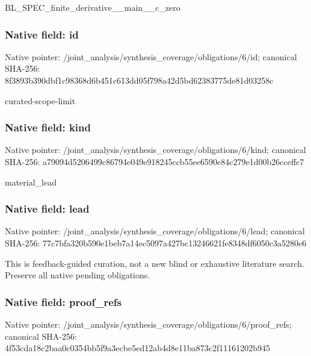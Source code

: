 \documentclass[10pt,a4paper]{article}
\begin{document}
\begingroup\raggedright\sloppy BL\_\allowbreak{}SPEC\_\allowbreak{}finite\_\allowbreak{}derivative\_\allowbreak{}\_\allowbreak{}main\_\allowbreak{}\_\allowbreak{}c\_\allowbreak{}zero\par\endgroup

\subsubsection{Native field: id}
Native pointer: /joint\_\allowbreak{}analysis/synthesis\_\allowbreak{}coverage/obligations/6/id; canonical SHA-256: 8f3893b390dbf1c98368d6b451c613dd05f798a42d5bd62383775de81d03258c

\begingroup\raggedright\sloppy curated-scope-limit\par\endgroup

\subsubsection{Native field: kind}
Native pointer: /joint\_\allowbreak{}analysis/synthesis\_\allowbreak{}coverage/obligations/6/kind; canonical SHA-256: a79094d5206499c86794e049e918245ccb55ee6590e84c279e1d00b26cceffc7

\begingroup\raggedright\sloppy material\_\allowbreak{}lead\par\endgroup

\subsubsection{Native field: lead}
Native pointer: /joint\_\allowbreak{}analysis/synthesis\_\allowbreak{}coverage/obligations/6/lead; canonical SHA-256: 77c7bfa320b590e1beb7a14ec5097a427bc13246621fe8348df6050c3a5280e6

\begingroup\raggedright\sloppy This is feedback-guided curation,\allowbreak{} not a new blind or exhaustive literature search. Preserve all native pending obligations.\par\endgroup

\subsubsection{Native field: proof\_\allowbreak{}refs}
Native pointer: /joint\_\allowbreak{}analysis/synthesis\_\allowbreak{}coverage/obligations/6/proof\_\allowbreak{}refs; canonical SHA-256: 4f53cda18c2baa0c0354bb5f9a3ecbe5ed12ab4d8e11ba873c2f11161202b945
\end{document}
